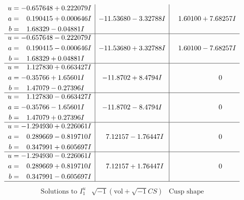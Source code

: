 \documentclass[1p]{elsarticle_modified}
\theoremstyle{definition}
\newcommand{\I}{\sqrt{-1}}
\begin{document}
$$\begin{array}{c|c|c}
\begin{aligned}
u &= -0.657648 + 0.222079 I \\
a &= \phantom{-}0.190415 + 0.000646 I \\
b &= \phantom{-}1.68329 - 0.04881 I\end{aligned}
 & -11.53680 - 3.32788 I & \phantom{-}1.60100 + 7.68257 I \\ \hline\begin{aligned}
u &= -0.657648 - 0.222079 I \\
a &= \phantom{-}0.190415 - 0.000646 I \\
b &= \phantom{-}1.68329 + 0.04881 I\end{aligned}
 & -11.53680 + 3.32788 I & \phantom{-}1.60100 - 7.68257 I \\ \hline\begin{aligned}
u &= \phantom{-}1.127830 + 0.663427 I \\
a &= -0.35766 + 1.65601 I \\
b &= \phantom{-}1.47079 - 0.27396 I\end{aligned}
 & -11.8702 + 8.4794 I & \phantom{-0.000000 } 0 \\ \hline\begin{aligned}
u &= \phantom{-}1.127830 - 0.663427 I \\
a &= -0.35766 - 1.65601 I \\
b &= \phantom{-}1.47079 + 0.27396 I\end{aligned}
 & -11.8702 - 8.4794 I & \phantom{-0.000000 } 0 \\ \hline\begin{aligned}
u &= -1.294930 + 0.226061 I \\
a &= \phantom{-}0.289669 - 0.819710 I \\
b &= \phantom{-}0.347991 + 0.605697 I\end{aligned}
 & \phantom{-}7.12157 - 1.76447 I & \phantom{-0.000000 } 0 \\ \hline\begin{aligned}
u &= -1.294930 - 0.226061 I \\
a &= \phantom{-}0.289669 + 0.819710 I \\
b &= \phantom{-}0.347991 - 0.605697 I\end{aligned}
 & \phantom{-}7.12157 + 1.76447 I & \phantom{-0.000000 } 0\\
 \hline 
 \end{array}$$\newpage$$\begin{array}{c|c|c}  
\text{Solutions to }I^u_{1}& \I (\text{vol} + \sqrt{-1}CS) & \text{Cusp shape}\\

\end{array}$$
\end{document}
